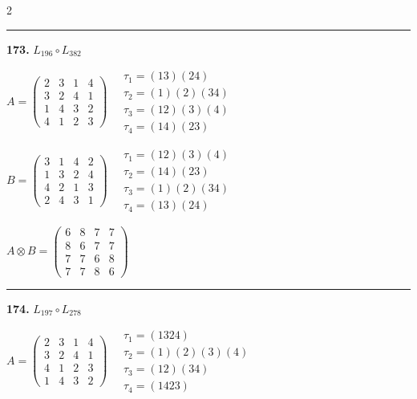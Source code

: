 \begin{multicols}{2}
\vspace{0.3em}
\hrule
\vspace{0.3em}

\noindent\textbf{173.} $L_{196} \circ L_{382}$

$A = \begin{pmatrix} 2 & 3 & 1 & 4 \\ 3 & 2 & 4 & 1 \\ 1 & 4 & 3 & 2 \\ 4 & 1 & 2 & 3 \end{pmatrix} \quad \begin{matrix} \tau_{1}=(1 3)(2 4) \\ \tau_{2}=(1)(2)(3 4) \\ \tau_{3}=(1 2)(3)(4) \\ \tau_{4}=(1 4)(2 3) \end{matrix}$

$B = \begin{pmatrix} 3 & 1 & 4 & 2 \\ 1 & 3 & 2 & 4 \\ 4 & 2 & 1 & 3 \\ 2 & 4 & 3 & 1 \end{pmatrix} \quad \begin{matrix} \tau_{1}=(1 2)(3)(4) \\ \tau_{2}=(1 4)(2 3) \\ \tau_{3}=(1)(2)(3 4) \\ \tau_{4}=(1 3)(2 4) \end{matrix}$

$A \otimes B = \begin{pmatrix} 6 & 8 & 7 & 7 \\ 8 & 6 & 7 & 7 \\ 7 & 7 & 6 & 8 \\ 7 & 7 & 8 & 6 \end{pmatrix}$

\vspace{0.3em}
\hrule
\vspace{0.3em}

\noindent\textbf{174.} $L_{197} \circ L_{278}$

$A = \begin{pmatrix} 2 & 3 & 1 & 4 \\ 3 & 2 & 4 & 1 \\ 4 & 1 & 2 & 3 \\ 1 & 4 & 3 & 2 \end{pmatrix} \quad \begin{matrix} \tau_{1}=(1 3 2 4) \\ \tau_{2}=(1)(2)(3)(4) \\ \tau_{3}=(1 2)(3 4) \\ \tau_{4}=(1 4 2 3) \end{matrix}$


\end{multicols}
